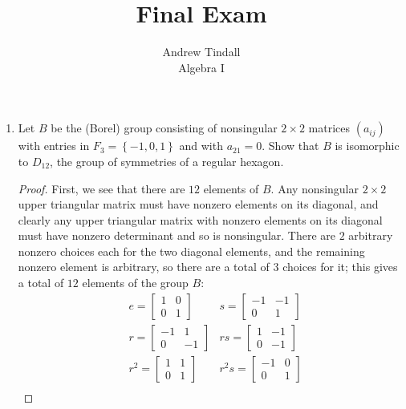 \documentclass[12pt]{article}
\theoremstyle{definition}
\newenvironment{problem}[2][Problem]{\begin{trivlist}
\item[\hskip \labelsep {\bfseries #1}\hskip \labelsep {\bfseries #2.}]}{\end{trivlist}}
\begin{document}
 
 
\title{Final Exam}
\author{Andrew Tindall
\\ Algebra I}
 
\maketitle
\begin{problem}{1}
	\begin{enumerate}[label=(\alph*)]
		\item Let $B$ be the (Borel) group consisting of nonsingular $2 \times 2$ matrices $(a_{ij})$ with entries in $F_3 = \left\{ -1, 0,1  \right\}$ and with $a_{21} = 0$. Show that $B$ is isomorphic to $D_{12}$, the group of symmetries of a regular hexagon.
			\begin{proof}
				First, we see that there are $12$ elements of $B$. Any nonsingular $2\times 2$ upper triangular matrix must have nonzero elements on its diagonal, and clearly any upper triangular matrix with nonzero elements on its diagonal must have nonzero determinant and so is nonsingular. There are $2$ arbitrary nonzero choices each for the two diagonal elements, and the remaining nonzero element is arbitrary, so there are a total of $3$ choices for it; this gives a total of $12$ elements of the group $B$:
				\begin{align*}
					&e = \begin{bmatrix}
						1 & 0 \\ 0 & 1
					\end{bmatrix} & s = \begin{bmatrix}
						-1 & -1 \\ 0 & 1
					\end{bmatrix} \\
					& r = \begin{bmatrix}
						-1 & 1 \\ 0 & -1		
					\end{bmatrix} & rs = \begin{bmatrix}
						1 & -1 \\ 0 & -1	
					\end{bmatrix} \\
					& r^2 = \begin{bmatrix}
						1 & 1 \\ 0 & 1
					\end{bmatrix} & r^2s = \begin{bmatrix}
						-1 & 0 \\ 0 & 1
					\end{bmatrix}\\

\end{align*}
\end{proof}
\end{enumerate}
\end{problem}
\end{document}
